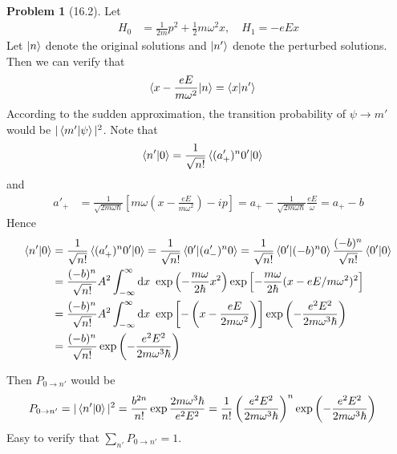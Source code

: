 \documentclass[twoside,11pt]{article}
\renewcommand*\d{\mathop{}\!\mathrm{d}}
\theoremstyle{definition}
\newtheorem{problem}{Problem}
\theoremstyle{remark}
\begin{document}
\begin{problem}[16.2]
Let 
\begin{align*}
    H_0 &= \frac{1}{2m}p^2 + \frac{1}{2}m\omega^2 x,\quad
    H_1 = -eEx
\end{align*}
Let $\ket{n}$ denote the original solutions
and $\ket{n'}$ denote the perturbed solutions.
Then we can verify that
\begin{align*}
    \braket{x-\frac{eE}{m\omega^2}|n} &= 
    \braket{x|n'}
\end{align*}
According to the sudden approximation, the transition probability
of $\psi\rightarrow m'$ would be $|\braket{m'|\psi}|^2$.
Note that
\begin{align*}
    \braket{n'|0} &= 
    \frac{1}{\sqrt{n!}}\braket{(a'_+)^n 0'|0}
\end{align*}
and
\begin{align*}
    a'_+ &= \frac{1}{\sqrt{2m\omega\hbar}}
    \left[m\omega\left(x - \frac{eE}{m\omega^2}\right) - ip\right]
    = a_+ - \frac{1}{\sqrt{2m\omega\hbar}}\frac{eE}{\omega}
    = a_+ - b
\end{align*}
Hence
\begin{align*}
    \braket{n'|0} 
    &= \frac{1}{\sqrt{n!}}\braket{(a_+')^n0'|0}
    = \frac{1}{\sqrt{n!}}\braket{0'|(a'_-)^n0}
    = \frac{1}{\sqrt{n!}}\braket{0'|(-b)^n 0}
    \frac{(-b)^n}{\sqrt{n!}}\braket{0'|0}\\
    &= 
    \frac{(-b)^n}{\sqrt{n!}}A^2
    \int_{-\infty}^\infty\d x\
    \exp\left(-\frac{m\omega}{2\hbar}x^2\right)
    \exp\left[-\frac{m\omega}{2\hbar}(x-eE/m\omega^2)^2\right]\\
    &= \frac{(-b)^n}{\sqrt{n!}}A^2
    \int_{-\infty}^\infty\d x\
    \exp\left[-\left(x-\frac{eE}{2m\omega^2}\right)\right]
    \exp\left(-\frac{e^2E^2}{2m\omega^3 \hbar} \right)\\
    &= \frac{(-b)^n}{\sqrt{n!}}
    \exp\left(-\frac{e^2E^2}{2m\omega^3 \hbar} \right)
\end{align*}

Then $P_{0\rightarrow n'}$ would be
\begin{align*}
    P_{0\rightarrow n'} &= |\braket{n'|0}|^2
    = \frac{b^{2n}}{n!}\exp\frac{2m\omega^3\hbar}{e^2E^2}
    = \frac{1}{n!}\left(\frac{e^2E^2}{2m\omega^3\hbar}\right)^n
    \exp\left(-\frac{e^2E^2}{2m\omega^3\hbar}\right)
\end{align*}
Easy to verify that $\sum_{n'} P_{0\rightarrow n'}=1$.

\end{problem}



\end{document}
